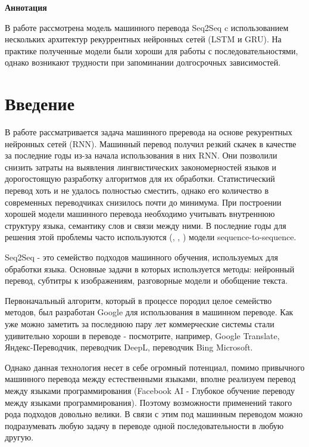 



	
	

	\begin{center}
	    \textbf{Аннотация}
	\end{center}
	
	В работе рассмотрена модель машинного перевода Seq2Seq c использованием нескольких архитектур рекуррентных нейронных сетей (LSTM и GRU). На практике полученные модели были хороши для работы с последовательностями, однако возникают трудности при запоминании долгосрочных зависимостей.
	
	\clearpage
	
	\section{Введение}
	
	В работе рассматривается задача машинного преревода на основе рекурентных нейронных сетей (RNN). Машинный перевод получил резкий скачек в качестве за последние годы из-за начала использования в них RNN. Они позволили снизить затраты на выявления лингвистических закономерностей языков и дорогостоящую разработку алгоритмов для их обработки. Статистический перевод хоть и не удалось полностью сместить, однако его количество в современных переводчиках снизилось почти до минимума. При построении хорошей модели машинного перевода необходимо учитывать внутреннюю структуру языка, семантику слов и связи между ними. В последние годы для решения этой проблемы часто используются (\cite{10}, \cite{11}, \cite{12}) модели sequence-to-sequence.
	
	Seq2Seq - это семейство подходов машинного обучения, используемых для обработки языка. Основные задачи в которых используется методы: нейронный перевод, субтитры к изображениям, разговорные модели и обобщение текста.
	
	Первоначальный алгоритм, который в процессе породил целое семейство методов, был разработан Google для использования в машинном переводе. Как уже можно заметить за последнюю пару лет коммерческие системы стали удивительно хороши в  переводе - посмотрите, например, Google Translate, Яндекс-Переводчик, переводчик DeepL, переводчик Bing Microsoft.
	
	Однако данная технология несет в себе огромный потенциал, помимо привычного машинного перевода между естественными языками, вполне реализуем перевод между языками программирования (Facebook AI - Глубокое обучение переводу между языками программирования). Поэтому возможности применений такого рода подходов довольно велики. В связи с этим под машинным переводом можно подразумевать любую задачу в переводе одной последовательности в любую другую.
	
